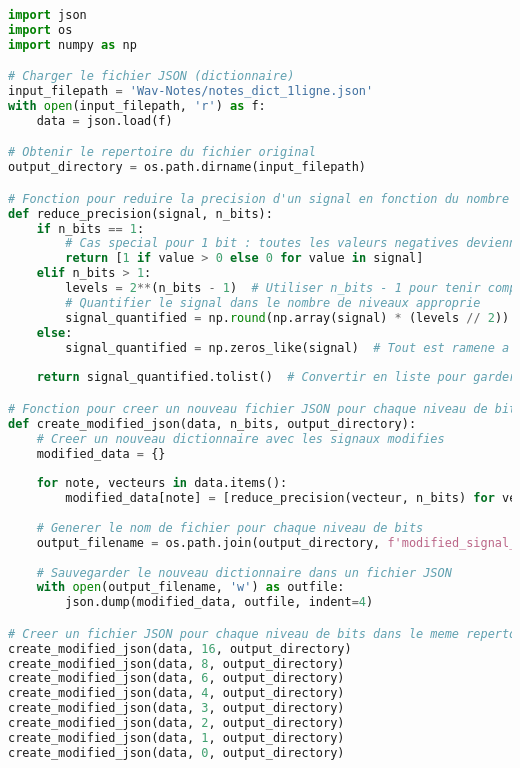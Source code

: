 \documentclass[11pt,letterpaper]{article}
\begin{document}
\begin{lstlisting}[language=python]
import json
import os
import numpy as np

# Charger le fichier JSON (dictionnaire)
input_filepath = 'Wav-Notes/notes_dict_1ligne.json'
with open(input_filepath, 'r') as f:
    data = json.load(f)

# Obtenir le repertoire du fichier original
output_directory = os.path.dirname(input_filepath)

# Fonction pour reduire la precision d'un signal en fonction du nombre de bits
def reduce_precision(signal, n_bits):
    if n_bits == 1:
        # Cas special pour 1 bit : toutes les valeurs negatives deviennent 0
        return [1 if value > 0 else 0 for value in signal]
    elif n_bits > 1:
        levels = 2**(n_bits - 1)  # Utiliser n_bits - 1 pour tenir compte du bit de signe
        # Quantifier le signal dans le nombre de niveaux approprie
        signal_quantified = np.round(np.array(signal) * (levels // 2)) / (levels // 2)
    else:
        signal_quantified = np.zeros_like(signal)  # Tout est ramene a zero pour 0 bit
    
    return signal_quantified.tolist()  # Convertir en liste pour garder le format JSON

# Fonction pour creer un nouveau fichier JSON pour chaque niveau de bits
def create_modified_json(data, n_bits, output_directory):
    # Creer un nouveau dictionnaire avec les signaux modifies
    modified_data = {}
    
    for note, vecteurs in data.items():
        modified_data[note] = [reduce_precision(vecteur, n_bits) for vecteur in vecteurs]
    
    # Generer le nom de fichier pour chaque niveau de bits
    output_filename = os.path.join(output_directory, f'modified_signal_{n_bits}bit.json')
    
    # Sauvegarder le nouveau dictionnaire dans un fichier JSON
    with open(output_filename, 'w') as outfile:
        json.dump(modified_data, outfile, indent=4)

# Creer un fichier JSON pour chaque niveau de bits dans le meme repertoire que le fichier original
create_modified_json(data, 16, output_directory)
create_modified_json(data, 8, output_directory)
create_modified_json(data, 6, output_directory)
create_modified_json(data, 4, output_directory)
create_modified_json(data, 3, output_directory)
create_modified_json(data, 2, output_directory)
create_modified_json(data, 1, output_directory)
create_modified_json(data, 0, output_directory)
\end{lstlisting}
\end{document}
